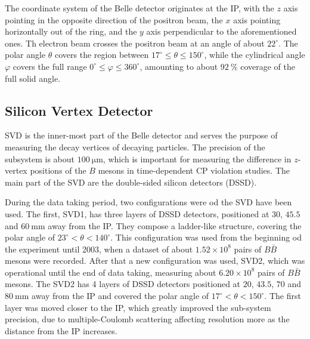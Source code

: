 \documentclass[headings=standardclasses,headings=big,oneside,a4paper,openany,12pt]{scrbook}
\newcommand {\e}[1]{\mathrm{~#1}}
\newcommand {\E}[1]{\times 10^{#1}}
\begin{document}
The coordinate system of the Belle detector originates at the IP, with the $z$ axis pointing in the opposite direction of the positron beam, the $x$ axis pointing horizontally out of the ring, and the $y$ axis perpendicular to the aforementioned ones. Th electron beam crosses the positron beam at an angle of about $22^\circ$. The polar angle $\theta$ covers the region between $17^\circ \leq \theta \leq 150^\circ$, while the cylindrical angle $\varphi$ covers the full range $0^\circ \leq \varphi \leq 360^\circ$, amounting to about $92~\%$ coverage of the full solid angle.




\subsection{Silicon Vertex Detector}
SVD is the inner-most part of the Belle detector and serves the purpose of measuring the decay vertices of decaying particles. The precision of the subsystem is about $100\e{\mu m}$, which is important for measuring the difference in $z$-vertex positions of the $B$ mesons in time-dependent CP violation studies. The main part of the SVD are the double-sided silicon detectors (DSSD).

During the data taking period, two configurations were od the SVD have been used. The first, SVD1, has three layers of DSSD detectors, positioned at $30$, $45.5$ and $60\e{mm}$ away from the IP. They compose a ladder-like structure, covering the polar angle of $23^\circ < \theta < 140^\circ$. This configuration was used from the beginning od the experiment until 2003, when a dataset of about $1.52\E{8}$ pairs of $B \bar B$ mesons were recorded. After that a new configuration was used, SVD2, which was operational until the end of data taking, measuring about $6.20\E{8}$ pairs of $B \bar B$ mesons. The SVD2 has 4 layers of DSSD detectors positioned at $20$, $43.5$, $70$ and $80\e{mm}$ away from the IP and covered the polar angle of $17^\circ < \theta < 150^\circ$. The first layer was moved closer to the IP, which greatly improved the sub-system precision, due to multiple-Coulomb scattering affecting resolution more as the distance from the IP increases.
\end{document}
